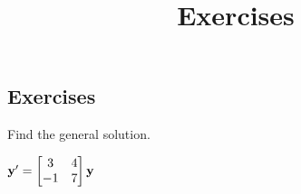 \documentclass{ximera}
\title{Exercises} \license{CC BY-NC-SA 4.0}
\begin{document}
\begin{abstract}
\end{abstract}
\maketitle

\begin{onlineOnly}
\section*{Exercises}
\end{onlineOnly}


 \begin{problem}\label{exer:10.5.1}
 Find the general solution.
 
 $ {\bf y}'= \begin{bmatrix}3&4\\-1&7\end{bmatrix}{\bf y}$

  \end{problem}
\end{document}
